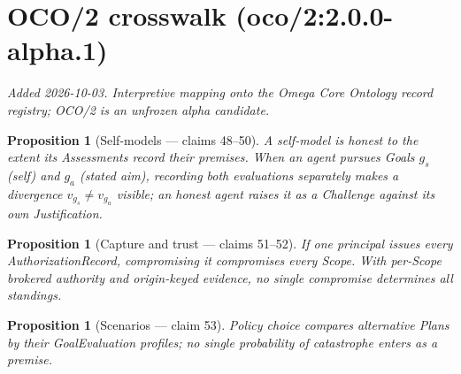 \documentclass[11pt,a4paper]{article}
\newtheorem{proposition}[definition]{Proposition}
\begin{document}
\section{OCO/2 crosswalk (oco/2:2.0.0-alpha.1)}
\emph{Added 2026-10-03. Interpretive mapping onto the Omega Core Ontology
record registry; OCO/2 is an unfrozen alpha candidate.}

\begin{proposition}[Self-models --- claims 48--50]
A self-model is honest to the extent its Assessments record their premises. When an agent pursues Goals $g_s$ (self) and $g_a$ (stated aim), recording both evaluations separately makes a divergence $v_{g_s}\neq v_{g_a}$ visible; an honest agent raises it as a Challenge against its own Justification.
\end{proposition}

\begin{proposition}[Capture and trust --- claims 51--52]
If one principal issues every AuthorizationRecord, compromising it compromises every Scope. With per-Scope brokered authority and origin-keyed evidence, no single compromise determines all standings.
\end{proposition}

\begin{proposition}[Scenarios --- claim 53]
Policy choice compares alternative Plans by their GoalEvaluation profiles; no single probability of catastrophe enters as a premise.
\end{proposition}
\end{document}
